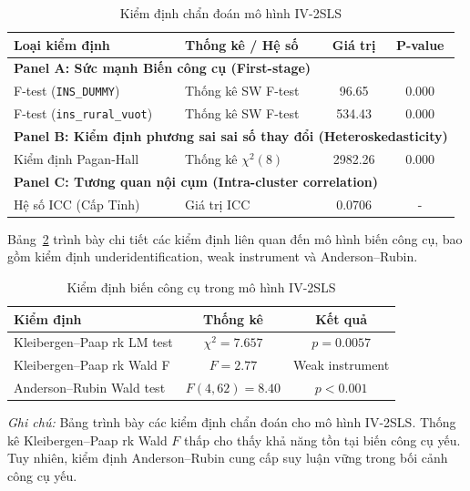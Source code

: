 \documentclass[12pt,a4paper]{article}
\begin{document}
\begin{table}[htbp]
	\centering
	\caption{Kiểm định chẩn đoán mô hình IV-2SLS}
	\label{tab:diagnostics}
	\begin{tabular}{llcc}
		\toprule
		\textbf{Loại kiểm định} & \textbf{Thống kê / Hệ số} & \textbf{Giá trị} & \textbf{P-value} \\
		\midrule
		\multicolumn{4}{l}{\textbf{Panel A: Sức mạnh Biến công cụ (First-stage)}} \\
		F-test (\texttt{INS\_DUMMY}) & Thống kê SW F-test & 96.65 & 0.000 \\
		F-test (\texttt{ins\_rural\_vuot}) & Thống kê SW F-test & 534.43 & 0.000 \\
		\midrule
		\multicolumn{4}{l}{\textbf{Panel B: Kiểm định phương sai sai số thay đổi (Heteroskedasticity)}} \\
		Kiểm định Pagan-Hall & Thống kê $\chi^2(8)$ & 2982.26 & 0.000 \\
		\midrule
		\multicolumn{4}{l}{\textbf{Panel C: Tương quan nội cụm (Intra-cluster correlation)}} \\
		Hệ số ICC (Cấp Tỉnh) & Giá trị ICC & 0.0706 & - \\
		\bottomrule
	\end{tabular}
\end{table}


Bảng~\ref{tab:iv_diagnostics} trình bày chi tiết các kiểm định liên quan đến mô hình biến công cụ, bao gồm kiểm định underidentification, weak instrument và Anderson--Rubin.

\begin{table}[H]
	\centering
	\caption{Kiểm định biến công cụ trong mô hình IV-2SLS}
	\label{tab:iv_diagnostics}
	\begin{tabular}{lcc}
		\hline
		\textbf{Kiểm định} & \textbf{Thống kê} & \textbf{Kết quả} \\
		\hline
		Kleibergen--Paap rk LM test & $\chi^2 = 7.657$ & $p = 0.0057$ \\
		Kleibergen--Paap rk Wald F & $F = 2.77$ & Weak instrument \\
		Anderson--Rubin Wald test & $F(4,62)=8.40$ & $p < 0.001$ \\
		\hline
	\end{tabular}
	
	\begin{flushleft}
		\footnotesize
		\textit{Ghi chú:} Bảng trình bày các kiểm định chẩn đoán cho mô hình IV-2SLS. Thống kê Kleibergen--Paap rk Wald $F$ thấp cho thấy khả năng tồn tại biến công cụ yếu. Tuy nhiên, kiểm định Anderson--Rubin cung cấp suy luận vững trong bối cảnh công cụ yếu.
	\end{flushleft}
	
\end{table}
\end{document}
